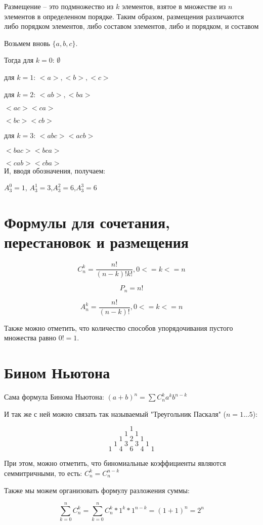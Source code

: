\documentclass{article}
\begin{document}
Размещение -- это подмножество из $k$ элементов, взятое в множестве из $n$ элементов в  определенном порядке.
Таким образом, размещения различаются либо порядком элементов, либо составом элементов, либо и порядком, и составом

Возьмем вновь $\{a, b, c\}$.

Тогда для $k = 0$: $\emptyset$

для $k = 1$: $<a>, <b>, <c>$

для $k = 2$: $<ab>, <ba>$

\qquad\qquad\quad$<ac> <ca>$

\qquad\qquad\quad$<bc> <cb>$

для $k = 3$: $<abc> <acb>$

\qquad\qquad\quad$<bac> <bca>$

\qquad\qquad\quad$<cab> <cba>$
\\
И, вводя обозначения, получаем:

$A^0_3 = 1$, \quad$A^1_3 = 3$,\quad $A^2_3 = 6$,\quad $A^3_3 = 6$


\section{Формулы для сочетания, перестановок и размещения}

$$C^k_n = \frac{n!}{(n - k)!k!}, 0 <= k <= n$$

$$P_n = n!$$

$$A^k_n = \frac{n!}{(n - k)!}, 0 <= k <= n$$

Также можно отметить, что количество способов упорядочивания пустого множества равно $0! = 1$.

\section{Бином Ньютона}

Сама формула Бинома Ньютона:
$(a + b)^n = \sum{C^k_na^kb^{n-k}} $

И так же с ней можно связать так называемый "Треугольник Паскаля" ($ n = 1...5$):

$$1$$
$$1 \quad 1$$
$$1 \quad 2 \quad 1$$
$$1 \quad 3 \quad 3 \quad 1$$
$$1 \quad 4 \quad 6 \quad 4 \quad 1$$

При этом, можно отметить, что биномиальные коэффициенты являются семмитричными, то есть: $C_n^k = C_n^{n - k}$

Также мы можем организовать формулу разложения суммы:

$$\sum_{k = 0}^{n}{C_n^k} = \sum_{k = 0}^{n}{C_n^k * 1^k * 1^{n - k}} = (1 + 1)^n = 2^n$$
\end{document}

